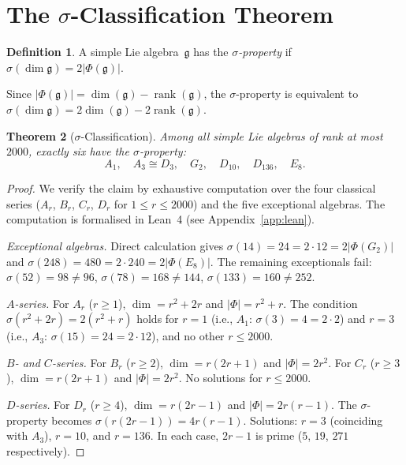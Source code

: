 \documentclass[11pt]{amsart}
\theoremstyle{plain}
\newtheorem{theorem}{Theorem}[section]
\theoremstyle{definition}
\newtheorem{definition}[theorem]{Definition}
\theoremstyle{remark}
\newcommand{\fg}{\mathfrak{g}}
\renewcommand{\Phi}{\varPhi}
\newcommand{\rank}{\operatorname{rank}}
\begin{document}
\section{The $\sigma$-Classification Theorem}\label{sec:sigma-class}

\begin{definition}\label{def:sigma-property}
A simple Lie algebra~$\fg$ has the \emph{$\sigma$-property} if
$\sigma(\dim\fg) = 2|\Phi(\fg)|$.
\end{definition}

Since $|\Phi(\fg)| = \dim(\fg) - \rank(\fg)$, the $\sigma$-property
is equivalent to $\sigma(\dim\fg) = 2\dim(\fg) - 2\rank(\fg)$.

\begin{theorem}[$\sigma$-Classification]\label{thm:sigma-class}
Among all simple Lie algebras of rank at most $2000$, exactly six
have the $\sigma$-property:
\[
  A_1, \quad A_3 \cong D_3, \quad G_2, \quad D_{10}, \quad D_{136}, \quad E_8.
\]
\end{theorem}

\begin{proof}
We verify the claim by exhaustive computation over the four classical
series ($A_r$, $B_r$, $C_r$, $D_r$ for $1 \le r \le 2000$) and the
five exceptional algebras.  The computation is formalised in Lean~4
(see Appendix~\ref{app:lean}).

\emph{Exceptional algebras.}
Direct calculation gives $\sigma(14) = 24 = 2 \cdot 12 = 2|{\Phi(G_2)}|$
and $\sigma(248) = 480 = 2 \cdot 240 = 2|{\Phi(E_8)}|$.  The remaining
exceptionals fail: $\sigma(52) = 98 \ne 96$, $\sigma(78) = 168 \ne 144$,
$\sigma(133) = 160 \ne 252$.

\emph{$A$-series.}
For $A_r$ ($r \ge 1$), $\dim = r^2+2r$ and $|\Phi| = r^2+r$.  The
condition $\sigma(r^2+2r) = 2(r^2+r)$ holds for $r=1$ (i.e., $A_1$:
$\sigma(3) = 4 = 2 \cdot 2$) and $r=3$ (i.e., $A_3$:
$\sigma(15) = 24 = 2 \cdot 12$), and no other $r \le 2000$.

\emph{$B$- and $C$-series.}
For $B_r$ ($r \ge 2$), $\dim = r(2r+1)$ and $|\Phi| = 2r^2$.
For $C_r$ ($r \ge 3$), $\dim = r(2r+1)$ and $|\Phi| = 2r^2$.
No solutions for $r \le 2000$.

\emph{$D$-series.}
For $D_r$ ($r \ge 4$), $\dim = r(2r-1)$ and $|\Phi| = 2r(r-1)$.
The $\sigma$-property becomes $\sigma(r(2r-1)) = 4r(r-1)$.
Solutions: $r = 3$ (coinciding with $A_3$), $r = 10$, and $r = 136$.
In each case, $2r-1$ is prime ($5$, $19$, $271$ respectively).
\end{proof}
\end{document}
